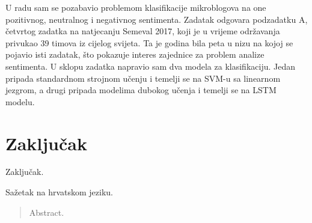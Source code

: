 \documentclass[times, utf8, zavrsni]{fer}
\begin{document}
U radu sam se pozabavio problemom klasifikacije mikroblogova na one pozitivnog, neutralnog i negativnog sentimenta. Zadatak odgovara podzadatku A, četvrtog zadatka na natjecanju Semeval 2017, koji je u vrijeme održavanja privukao 39 timova iz cijelog svijeta. Ta je godina bila peta u nizu na kojoj se pojavio isti zadatak, što pokazuje interes zajednice za problem analize sentimenta. U sklopu zadatka napravio sam dva modela za klasifikaciju. Jedan pripada standardnom strojnom učenju i temelji se na SVM-u sa linearnom jezgrom, a drugi pripada modelima dubokog učenja i temelji se na LSTM modelu.



\chapter{Zaključak}
Zaključak.




\begin{sazetak}
Sažetak na hrvatskom jeziku.

\end{sazetak}

\begin{abstract}
Abstract.

\end{abstract}
\end{document}
